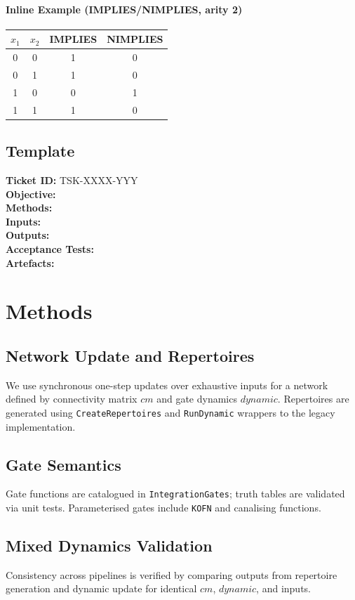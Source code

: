 \documentclass[11pt]{article}
\begin{document}
\paragraph{Inline Example (IMPLIES/NIMPLIES, arity 2)}
\begin{center}
\begin{tabular}{cc|cc}
\toprule
$x_1$ & $x_2$ & IMPLIES & NIMPLIES \\
\midrule
0 & 0 & 1 & 0 \\
0 & 1 & 1 & 0 \\
1 & 0 & 0 & 1 \\
1 & 1 & 1 & 0 \\
\bottomrule
\end{tabular}
\end{center}
\subsection*{Template}
\textbf{Ticket ID:} TSK-XXXX-YYY\\
\textbf{Objective:}\\
\textbf{Methods:}\\
\textbf{Inputs:}\\
\textbf{Outputs:}\\
\textbf{Acceptance Tests:}\\
\textbf{Artefacts:}\\
\section{Methods}
\subsection{Network Update and Repertoires}
We use synchronous one-step updates over exhaustive inputs for a network defined by connectivity matrix \(cm\) and gate dynamics \(dynamic\). Repertoires are generated using \texttt{CreateRepertoires} and \texttt{RunDynamic} wrappers to the legacy implementation.
\subsection{Gate Semantics}
Gate functions are catalogued in \texttt{Integration\textasciigrave Gates}; truth tables are validated via unit tests. Parameterised gates include \texttt{KOFN} and canalising functions.
\subsection{Mixed Dynamics Validation}
Consistency across pipelines is verified by comparing outputs from repertoire generation and dynamic update for identical \(cm\), \(dynamic\), and inputs.
\end{document}
